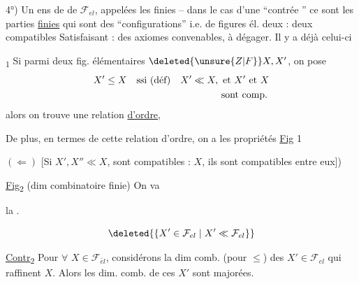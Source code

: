 
4°) Un ens de  de $\mathcal{F}_{el}$, appelées les \unsure{---} finies -- dans le cas d'une ``contrée '' ce sont les parties \uline{finies} qui sont des ``configurations''  i.e.  de figures él. deux : deux compatibles
Satisfaisant : des axiomes convenables, à dégager. Il y a déjà celui-ci

\uline{}\textsubscript{1}  Si parmi deux fig. élémentaires $\deleted{\unsure{Z|F}}X, X'$, on pose
\[
\begin{aligned}
X'\leq X\quad &\text{ssi (déf)}\quad X'\ll X,\ \text{et }X'\text{ et }X\\
&\hphantom{\text{ssi (déf)}\quad X'\ll X,\ }\text{sont comp.}
\end{aligned}
\]
alors on trouve une relation \uline{d'ordre},

De plus, en termes de cette relation d'ordre, on a les propriétés \uline{Fig} 1

\margin{$\vert\vert\vert$}
$(\Longleftarrow)$ [Si $X', X''\ll X$,  sont compatibles : $X$, ils sont compatibles entre eux])

\uline{Fig}\textsubscript{2} (dim combinatoire finie) On va

la  . 

\[
\deleted{\{X'\in \mathcal{F}_{el}\mid X'\ll \mathcal{F}_{el}\}}
\]

\uline{Contr}\textsubscript{2} Pour $\forall$ $X\in \mathcal{F}_{\bar e l}$, considérons la dim comb. (pour $\leq$) des $X'\in \mathcal{F}_{el}$  qui raffinent $X$. Alors les dim. comb. de ces $X'$ sont majorées.

